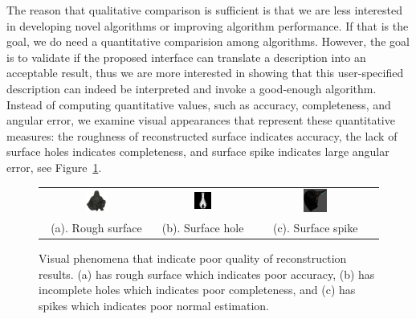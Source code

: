The reason that qualitative comparison is sufficient is that we are less interested in developing novel algorithms or improving algorithm performance. If that is the goal, we do need a quantitative comparision among algorithms. However, the goal is to validate if the proposed interface can translate a description into an acceptable result, thus we are more interested in showing that this user-specified description can indeed be interpreted and invoke a good-enough algorithm. Instead of computing quantitative values, such as accuracy, completeness, and angular error, we examine visual appearances that represent these quantitative measures: the roughness of reconstructed surface indicates accuracy, the lack of surface holes indicates completeness, and surface spike indicates large angular error, see Figure~\ref{fig:vis_quality}.
\begin{figure}[!htbp]
\centering
\begin{tabular}{ccc}
\includegraphics[width=0.2\textwidth]{img/interp/synth_interp/budda_vh} &
\includegraphics[width=0.2\textwidth]{img/interp/synth_interp/vase0_sl} &
\includegraphics[width=0.2\textwidth]{img/interp/real_interp/vase/vase_spike} \\
(a). Rough surface & (b). Surface hole & (c). Surface spike\\
\end{tabular}
\caption{Visual phenomena that indicate poor quality of reconstruction results. (a) has rough surface which indicates poor accuracy, (b) has incomplete holes which indicates poor completeness, and (c) has spikes which indicates poor normal estimation.}
\label{fig:vis_quality}
\end{figure}

